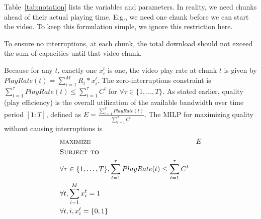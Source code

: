 
Table~\ref{tab:notation} lists the variables and parameters.
In reality, we need chunks ahead of their actual playing
time. E.g., we need one chunk before we can start the video. To keep
this formulation simple, we ignore this restriction here.

To ensure  no interruptions, at each chunk, the total download
should not exceed the sum of capacities until that video chunk.



Because for any $t$, exactly one $x_i^t$ is one, the video play rate 
at chunk $t$ is given by 
$PlayRate(t) = \sum \limits_{i=1}^M R_i *  x_i^t$. 
The zero-interruptions constraint is 
$\sum \limits_{t=1}^\tau  PlayRate(t) \leq\sum\limits_{t=1}^\tau C^t$
for $\forall \tau \in \{1, \dots, T\}$.
As stated earlier, quality (play efficiency) 
is the overall utilization of the available bandwidth
over time period $[1:T]$, defined as
$E =\frac{\sum\limits_{t=1}^T  PlayRate(t)}{\sum\limits_{t=1}^T C^t}$. 
The MILP for maximizing quality without causing interruptions is
\begin{subequations}
\begin{align*}
&\textsc{maximize }&{E}\\ 
&\textsc{Subject to}\\
&\forall \tau \in \{1, \dots, T\}, \sum \limits_{t=1}^\tau  PlayRate(t)
\leq\sum\limits_{t=1}^\tau C^t \\
& \forall t, \sum \limits_{i=1}^M x_i^t =1\ \\
& \forall t, i, x_i^t = \{0,1\}
\end{align*}
\end{subequations}

